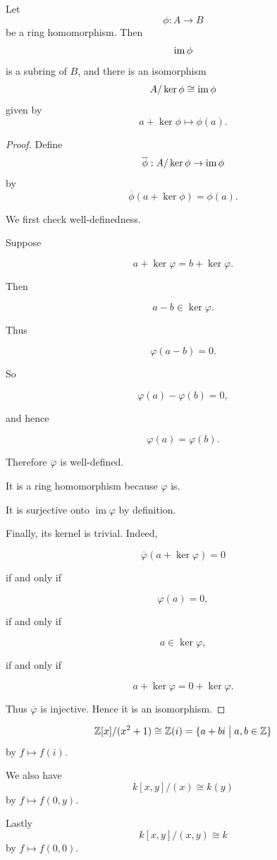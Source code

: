 \documentclass[11pt]{article}
\begin{document}
\begin{thm}
    Let 
    \[
        \phi : A \to B
    \]
    be a ring homomorphism. Then 
    \[
        \operatorname{im} \phi
    \]
    is a subring of $B$, and there is an isomorphism 
    \[
        A / \ker \phi \cong \operatorname{im} \phi 
    \]
    given by 
    \[
        a + \ker \phi \mapsto \phi(a). 
    \]
\end{thm}
\begin{proof}
    Define 
    \[
        \overline{\phi} : A/\ker \phi \to \operatorname{im} \phi
    \]
    by 
    \[
        \overline \phi(a + \ker \phi) = \phi(a). 
    \]

    We first check well-definedness.

    Suppose

    $$a+\ker\varphi=b+\ker\varphi.$$

    Then

    $$a-b\in\ker\varphi.$$

    Thus

    $$\varphi(a-b)=0.$$

    So

    $$\varphi(a)-\varphi(b)=0,$$

    and hence

    $$\varphi(a)=\varphi(b).$$

    Therefore $\overline{\varphi}$ is well-defined.

    It is a ring homomorphism because $\varphi$ is.

    It is surjective onto $\operatorname{im}\varphi$ by definition.

    Finally, its kernel is trivial. Indeed,

    $$\overline{\varphi}(a+\ker\varphi)=0$$

    if and only if

    $$\varphi(a)=0,$$

    if and only if

    $$a\in\ker\varphi,$$

    if and only if

    $$a+\ker\varphi=0+\ker\varphi.$$

    Thus $\overline{\varphi}$ is injective. 
    Hence it is an isomorphism.
\end{proof}
\begin{ex}
    \[
        \mathbb Z[x]/(x^2 + 1) \cong \mathbb Z(i) = 
        \{a + bi \bigm| a,b \in \mathbb Z\}
    \]
    by $f \mapsto f(i)$. 

    We also have 
    \[
        k[x,y]/(x) \cong k(y) 
    \]
    by $f \mapsto f(0,y)$. 

    Lastly 
    \[
        k[x,y] / (x,y) \cong k
    \]
    by $f \mapsto f(0,0)$.
\end{ex}
\end{document}
